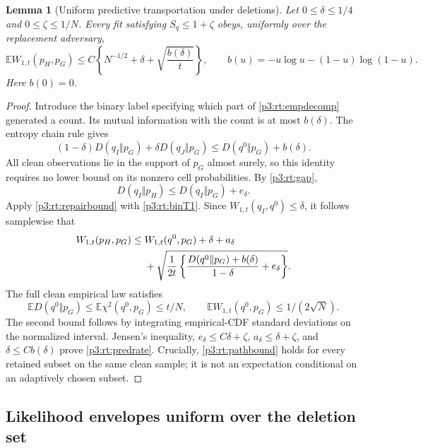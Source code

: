 \documentclass[11pt,a4paper]{article}
\newtheorem{lemma}[theorem]{Lemma}
\theoremstyle{definition}
\theoremstyle{remark}
\numberwithin{equation}{section}
\begin{document}
\begin{lemma}[Uniform predictive transportation under deletions]
\label{p3:rt:predictive}
Let $0\le\delta\le1/4$ and $0\le\zeta\le1/N$.  Every fit satisfying
$S_q\le1+\zeta$ obeys, uniformly over the replacement adversary,
\begin{equation}\label{p3:rt:predrate}
 \mathbb E W_{1,t}(p_H,p_G)
 \le C\left\{N^{-1/2}+\delta+
              \sqrt{\frac{b(\delta)}t}\right\},
 \qquad b(u)=-u\log u-(1-u)\log(1-u).
\end{equation}
Here $b(0)=0$.
\end{lemma}
\begin{proof}
Introduce the binary label specifying which part of
\eqref{p3:rt:empdecomp} generated a count.  Its mutual information with
the count is at most $b(\delta)$.  The entropy chain rule gives
\begin{equation}\label{p3:rt:deleteKL}
 (1-\delta)D(q_I\Vert p_G)+\delta D(q_J\Vert p_G)
          \le D(q^0\Vert p_G)+b(\delta).
\end{equation}
All clean observations lie in the support of $p_G$ almost surely, so
this identity requires no lower bound on its nonzero cell probabilities.
By \eqref{p3:rt:gap},
\[
 D(q_I\Vert p_H)\le D(q_I\Vert p_G)+e_\delta.
\]
Apply \eqref{p3:rt:repairbound} with \eqref{p3:rt:binT1}.  Since
$W_{1,t}(q_I,q^0)\le\delta$, it follows samplewise that
\begin{align}
 W_{1,t}(p_H,p_G)\le{}&W_{1,t}(q^0,p_G)+\delta+a_\delta\notag\\
 &+\sqrt{\frac1{2t}
       \left\{\frac{D(q^0\Vert p_G)+b(\delta)}{1-\delta}
                                                   +e_\delta\right\}}.
                                                        \label{p3:rt:pathbound}
\end{align}
The full clean empirical law satisfies
\[
 \mathbb E D(q^0\Vert p_G)\le\mathbb E\chi^2(q^0,p_G)
                      \le t/N,
 \qquad
 \mathbb E W_{1,t}(q^0,p_G)\le1/(2\sqrt N).
\]
The second bound follows by integrating empirical-CDF standard
deviations on the normalized interval.  Jensen's inequality,
$e_\delta\le C\delta+\zeta$, $a_\delta\le\delta+\zeta$, and
$\delta\le Cb(\delta)$ prove \eqref{p3:rt:predrate}.  Crucially,
\eqref{p3:rt:pathbound} holds for every retained subset on the same clean
sample; it is not an expectation conditional on an adaptively chosen
subset.
\end{proof}

\subsection{Likelihood envelopes uniform over the deletion set}
\end{document}
